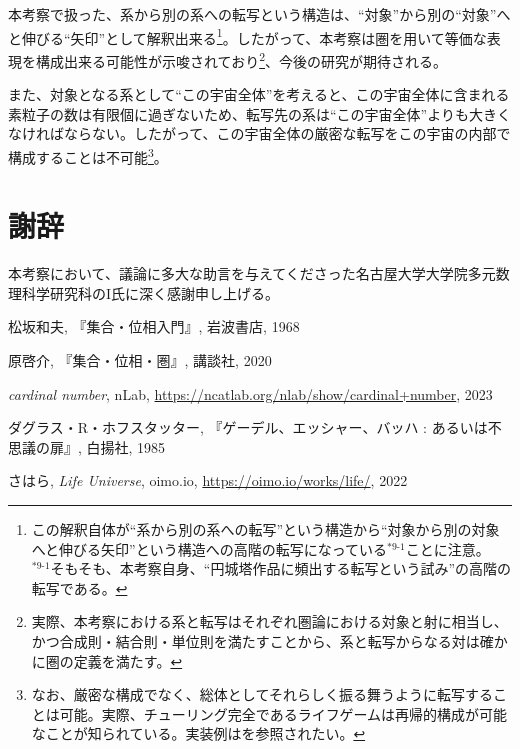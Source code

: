 \documentclass[10pt, a5paper, twoside]{jsarticle}
\theoremstyle{definition}
\begin{document}
		本考察で扱った、系から別の系への転写という構造は、“対象”から別の“対象”へと伸びる“矢印”として解釈出来る\footnote{この解釈自体が“系から別の系への転写”という構造から“対象から別の対象へと伸びる矢印”という構造への高階の転写になっている$^{*9\text{-}1}$ことに注意。\\$^{*9\text{-}1}$そもそも、本考察自身、“円城塔作品に頻出する転写という試み”の高階の転写である。}。したがって、本考察は圏を用いて等価な表現を構成出来る可能性が示唆されており\footnote{実際、本考察における系と転写はそれぞれ圏論における対象と射に相当し、かつ合成則・結合則・単位則を満たすことから、系と転写からなる対は確かに圏の定義を満たす。}、今後の研究が期待される。

		また、対象となる系として“この宇宙全体”を考えると、この宇宙全体に含まれる素粒子の数は有限個に過ぎないため、転写先の系は“この宇宙全体”よりも大きくなければならない。したがって、この宇宙全体の厳密な転写をこの宇宙の内部で構成することは不可能\footnote{なお、厳密な構成でなく、総体としてそれらしく振る舞うように転写することは可能。実際、チューリング完全であるライフゲームは再帰的構成が可能なことが知られている。実装例は\cite{shr}を参照されたい。}。

	\section{謝辞}

		本考察において、議論に多大な助言を与えてくださった名古屋大学大学院多元数理科学研究科のI氏に深く感謝申し上げる。

	\begin{thebibliography}{99}

		 松坂和夫, 『集合・位相入門』, 岩波書店, 1968

		 原啓介, 『集合・位相・圏』, 講談社, 2020

		 \textit{cardinal number}, nLab, \url{https://ncatlab.org/nlab/show/cardinal+number}, 2023

		 ダグラス・R・ホフスタッター, 『ゲーデル、エッシャー、バッハ : あるいは不思議の扉』, 白揚社, 1985

		 さはら, \textit{Life Universe}, oimo.io, \url{https://oimo.io/works/life/}, 2022

	\end{thebibliography}
\end{document}

